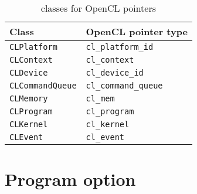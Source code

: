 \begin{table}[t]
  \begin{tabu}{X[l]X[l]}
    \toprule
    Class & OpenCL pointer type \\
    \midrule
    \texttt{CLPlatform}     & \texttt{cl\_platform\_id}   \\
    \texttt{CLContext}      & \texttt{cl\_context}        \\
    \texttt{CLDevice}       & \texttt{cl\_device\_id}     \\
    \texttt{CLCommandQueue} & \texttt{cl\_command\_queue} \\
    \texttt{CLMemory}       & \texttt{cl\_mem}            \\
    \texttt{CLProgram}      & \texttt{cl\_program}        \\
    \texttt{CLKernel}       & \texttt{cl\_kernel}         \\
    \texttt{CLEvent}        & \texttt{cl\_event}          \\
    \bottomrule
  \end{tabu}
  \caption{\protect\raii classes for OpenCL pointers}
  \label{tab:RAII classes for OpenCL pointers}
\end{table}

\section{Program option}
\label{sec:Program option}

